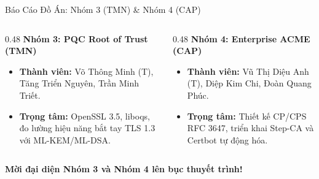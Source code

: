 \begin{frame}{Báo Cáo Đồ Án: Nhóm 3 (TMN) \& Nhóm 4 (CAP)}
  \begin{columns}[T]
    \begin{column}{0.48\textwidth}
      \textbf{Nhóm 3: PQC Root of Trust (TMN)}
      \begin{itemize}\small
        \item \textbf{Thành viên:} Võ Thông Minh (T), Tăng Triển Nguyên, Trần Minh Triết.
        \item \textbf{Trọng tâm:} OpenSSL 3.5, liboqs, đo lường hiệu năng bắt tay TLS 1.3 với ML-KEM/ML-DSA.
      \end{itemize}
    \end{column}
    \begin{column}{0.48\textwidth}
      \textbf{Nhóm 4: Enterprise ACME (CAP)}
      \begin{itemize}\small
        \item \textbf{Thành viên:} Vũ Thị Diệu Anh (T), Diệp Kim Chi, Đoàn Quang Phúc.
        \item \textbf{Trọng tâm:} Thiết kế CP/CPS RFC 3647, triển khai Step-CA và Certbot tự động hóa.
      \end{itemize}
    \end{column}
  \end{columns}

  \vspace{0.6em}
  \centering\large\sffamily\bfseries\color{hcmutblue}
  Mời đại diện Nhóm 3 và Nhóm 4 lên bục thuyết trình!
\end{frame}


